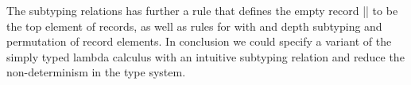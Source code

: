 The subtyping relations has further a rule that defines the empty
record \code|{}| to be the top element of records, as well as rules
for with and depth subtyping and permutation of record elements. In
conclusion we could specify a variant of the simply typed lambda
calculus with an intuitive subtyping relation and reduce the
non-determinism in the type system.

